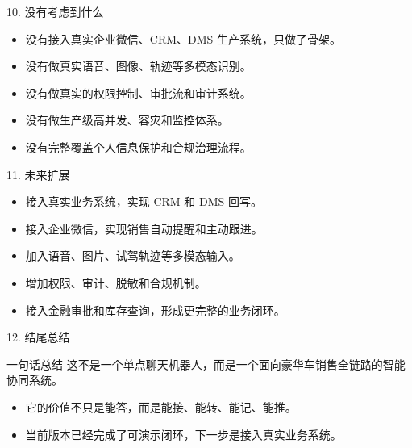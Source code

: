\documentclass[aspectratio=169,12pt]{beamer}
\begin{document}
\begin{frame}{10. 没有考虑到什么}
\begin{itemize}
  \item 没有接入真实企业微信、CRM、DMS 生产系统，只做了骨架。
  \item 没有做真实语音、图像、轨迹等多模态识别。
  \item 没有做真实的权限控制、审批流和审计系统。
  \item 没有做生产级高并发、容灾和监控体系。
  \item 没有完整覆盖个人信息保护和合规治理流程。
\end{itemize}
\end{frame}

\begin{frame}{11. 未来扩展}
\begin{itemize}
  \item 接入真实业务系统，实现 CRM 和 DMS 回写。
  \item 接入企业微信，实现销售自动提醒和主动跟进。
  \item 加入语音、图片、试驾轨迹等多模态输入。
  \item 增加权限、审计、脱敏和合规机制。
  \item 接入金融审批和库存查询，形成更完整的业务闭环。
\end{itemize}
\end{frame}

\begin{frame}{12. 结尾总结}
\begin{block}{一句话总结}
这不是一个单点聊天机器人，而是一个面向豪华车销售全链路的智能协同系统。
\end{block}
\begin{itemize}
  \item 它的价值不只是能答，而是能接、能转、能记、能推。
  \item 当前版本已经完成了可演示闭环，下一步是接入真实业务系统。
\end{itemize}
\end{frame}
\end{document}
